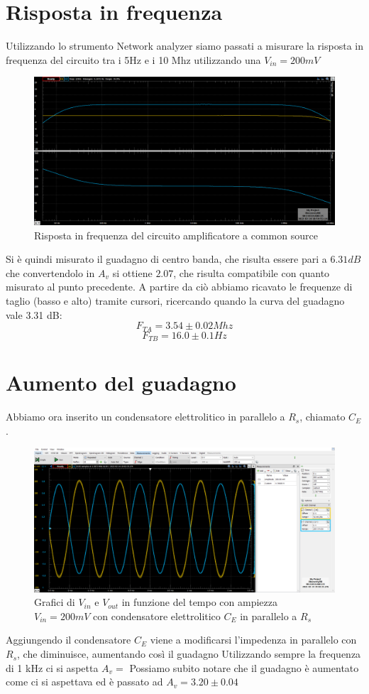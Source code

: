 \documentclass[10pt, a4paper, italian]{article}
\begin{document}
\section{Risposta in frequenza}
Utilizzando lo strumento Network analyzer siamo passati a misurare la risposta in frequenza del circuito tra i 5Hz e i 10 Mhz utilizzando una $V_{in}=200 mV$\\
\begin{figure}[H]
    \centering
	\includegraphics[scale=0.4]{network}
    \caption{Risposta in frequenza del circuito amplificatore a common source}
\end{figure}
Si è quindi misurato il guadagno di centro banda, che risulta essere pari a $6.31 dB$ che convertendolo in $A_v$ si ottiene $2.07$, che risulta compatibile con quanto misurato al punto precedente.
A partire da ciò abbiamo ricavato le frequenze di taglio (basso e alto) tramite cursori, ricercando quando la curva del guadagno vale 3.31 dB:
\[
F_{TA}=3.54 \pm 0.02Mhz
\]
\[
F_{TB}= 16.0 \pm 0.1Hz
\]
\section{Aumento del guadagno}
Abbiamo ora inserito un condensatore elettrolitico in parallelo a $R_s$, chiamato $C_E$.
\begin{figure}[H]
    \centering
	\includegraphics[scale=0.4]{amp.200.cap}
    \caption{Grafici di $V_{in}$ e $V_{out}$ in funzione del tempo con ampiezza $V_{in}=200 mV$ con condensatore elettrolitico $C_E$ in parallelo a $R_s$}
\end{figure}
Aggiungendo il condensatore $C_E$ viene a modificarsi l'impedenza in parallelo con $R_s$, che diminuisce, aumentando così il guadagno
Utilizzando sempre la frequenza di 1 kHz ci si aspetta $A_v =$
Possiamo subito notare che il guadagno è aumentato come ci si aspettava ed è passato ad $A_v =3.20 \pm 0.04$
\end{document}
